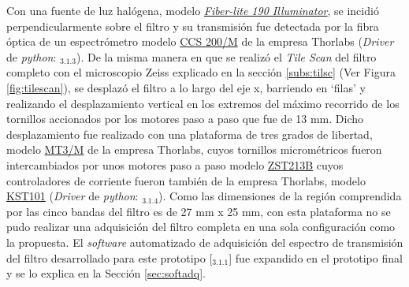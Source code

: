 Con una fuente de luz halógena, modelo \href{https://dolan-jenner.com/products/fiber-lite-190}{\textit{Fiber-lite 190 Illuminator}}, se incidió perpendicularmente sobre el filtro y su transmisión fue detectada por la fibra óptica de un espectrómetro modelo \href{https://www.thorlabs.com/thorproduct.cfm?partnumber=CCS200/M#ad-image-0}{CCS 200/M} de la empresa Thorlabs (\textit{Driver} de \textit{python}: \href{https://github.com/jrr1984/Prototipo0\_S-D\_SpectralGUI/blob/master/syst/CCS200.py}{\faGithub$_{3.1.3}$}). De la misma manera en que se realizó el \textit{Tile Scan} del filtro completo con el microscopio Zeiss explicado en la sección \ref{subs:tilsc} (Ver Figura \ref{fig:tilescan}), se desplazó el filtro a lo largo del eje x, barriendo en `filas' y realizando el desplazamiento vertical en los extremos del máximo recorrido de los tornillos accionados por los motores paso a paso que fue de 13 mm. Dicho desplazamiento fue realizado con una plataforma de tres grados de libertad, modelo \href{https://www.thorlabs.com/thorproduct.cfm?partnumber=MT3/M}{MT3/M} de la empresa Thorlabs, cuyos tornillos micrométricos fueron intercambiados por unos motores paso a paso modelo \href{https://www.thorlabs.com/thorproduct.cfm?partnumber=ZST213B}{ZST213B} cuyos controladores de corriente fueron también de la empresa Thorlabs, modelo \href{https://www.thorlabs.com/thorproduct.cfm?partnumber=KST101}{KST101} (\textit{Driver} de \textit{python}: \href{https://github.com/jrr1984/Prototipo0\_S-D\_SpectralGUI/blob/master/barrido/std/thor\_stepm.py}{\faGithub$_{3.1.4}$}). Como las dimensiones de la región comprendida por las cinco bandas del filtro es de 27 mm x 25 mm, con esta plataforma no se pudo realizar una adquisición del filtro completa en una sola configuración como la propuesta. El \textit{software} automatizado de adquisición del espectro de transmisión del filtro desarrollado para este prototipo [\href{https://github.com/jrr1984/Prototipo0\_S-D\_SpectralGUI/tree/master/barrido/std}{\faGithub$_{3.1.1}$}] fue expandido en el prototipo final y se lo explica en la Sección \ref{sec:softadq}.

